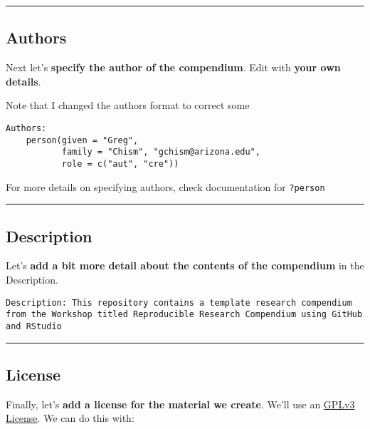 \documentclass[
  letterpaper,
  DIV=11,
  numbers=noendperiod]{scrreprt}
\begin{document}
\begin{center}\rule{0.5\linewidth}{0.5pt}\end{center}

\hypertarget{authors}{%
\subsection{Authors}\label{authors}}

Next let's \textbf{specify the author of the compendium}. Edit with
\textbf{your own details}.

Note that I changed the authors format to correct some

\begin{verbatim}
Authors:
    person(given = "Greg",
           family = "Chism", "gchism@arizona.edu", 
           role = c("aut", "cre"))
\end{verbatim}

For more details on specifying authors, check documentation for
\texttt{?person}

\begin{center}\rule{0.5\linewidth}{0.5pt}\end{center}

\hypertarget{description}{%
\subsection{Description}\label{description}}

Let's \textbf{add a bit more detail about the contents of the
compendium} in the Description.

\begin{verbatim}
Description: This repository contains a template research compendium from the Workshop titled Reproducible Research Compendium using GitHub and RStudio
\end{verbatim}

\begin{center}\rule{0.5\linewidth}{0.5pt}\end{center}

\hypertarget{license}{%
\subsection{License}\label{license}}

Finally, let's \textbf{add a license for the material we create}. We'll
use an \href{https://www.gnu.org/licenses/gpl-3.0.en.html}{GPLv3
License}. We can do this with:
\end{document}
